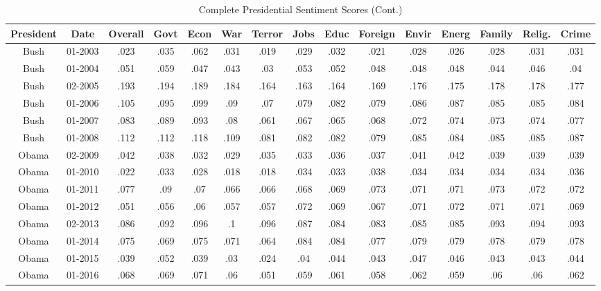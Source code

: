 \begin{sidewaystable}
\begin{singlespace}
\begin{center}
 \begin{tabular}{||c c c c c c c c c c c c c c c||}
 \hline
 President & Date & Overall & Govt & Econ & War & Terror & Jobs & Educ & Foreign & Envir & Energ & Family & Relig. & Crime \\
 \hline\hline
Bush & 01-2003 & .023 & .035 & .062 & .031 & .019 & .029 & .032 & .021 & .028 & .026 & .028 & .031 & .031 \\ 
\hline
Bush & 01-2004 & .051 & .059 & .047 & .043 & .03 & .053 & .052 & .048 & .048 & .048 & .044 & .046 & .04 \\ 
\hline
Bush & 02-2005 & .193 & .194 & .189 & .184 & .164 & .163 & .164 & .169 & .176 & .175 & .178 & .178 & .177 \\ 
\hline
Bush & 01-2006 & .105 & .095 & .099 & .09 & .07 & .079 & .082 & .079 & .086 & .087 & .085 & .085 & .084 \\ 
\hline
Bush & 01-2007 & .083 & .089 & .093 & .08 & .061 & .067 & .065 & .068 & .072 & .074 & .073 & .074 & .077 \\ 
\hline
Bush & 01-2008 & .112 & .112 & .118 & .109 & .081 & .082 & .082 & .079 & .085 & .084 & .085 & .085 & .087 \\ 
\hline
Obama & 02-2009 & .042 & .038 & .032 & .029 & .035 & .033 & .036 & .037 & .041 & .042 & .039 & .039 & .039 \\ 
\hline
Obama & 01-2010 & .022 & .033 & .028 & .018 & .018 & .034 & .033 & .038 & .034 & .034 & .034 & .034 & .036 \\ 
\hline
Obama & 01-2011 & .077 & .09 & .07 & .066 & .066 & .068 & .069 & .073 & .071 & .071 & .073 & .072 & .072 \\ 
\hline
Obama & 01-2012 & .051 & .056 & .06 & .057 & .057 & .072 & .069 & .067 & .071 & .072 & .071 & .071 & .069 \\ 
\hline
Obama & 02-2013 & .086 & .092 & .096 & .1 & .096 & .087 & .084 & .083 & .085 & .085 & .093 & .094 & .093 \\ 
\hline
Obama & 01-2014 & .075 & .069 & .075 & .071 & .064 & .084 & .084 & .077 & .079 & .079 & .078 & .079 & .078 \\ 
\hline
Obama & 01-2015 & .039 & .052 & .039 & .03 & .024 & .04 & .044 & .043 & .047 & .046 & .043 & .043 & .044 \\ 
\hline
Obama & 01-2016 & .068 & .069 & .071 & .06 & .051 & .059 & .061 & .058 & .062 & .059 & .06 & .06 & .062 \\ 
\hline
 \hline
 \end{tabular}
\end{center}
\caption{Complete Presidential Sentiment Scores (Cont.)}
\label{appendix:sent10}
\end{singlespace}
\end{sidewaystable}